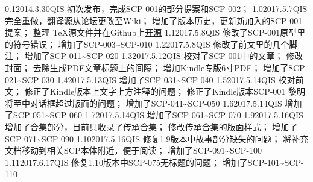 


\begin{versionhistory}
\vhEntry
{0.1}{2014.3.30}{QIS}{
	初次发布，完成SCP-001的部分提案和SCP-002；
}
\vhEntry
{1.0}{2017.5.7}{QIS}{
	完全重做，翻译源从论坛更改至Wiki；
	增加了版本历史，更新新加入的SCP-001提案；
	整理 \TeX 源文件并在Github上\href{https://github.com/7sDream/scp-pdf}{开源}
}
\vhEntry
{1.1}{2017.5.8}{QIS}{
	修改了SCP-001原型里的符号错误；
	增加了SCP-003\textasciitilde SCP-010
}
\vhEntry
{1.2}{2017.5.8}{QIS}{
	修改了前文里的几个脚注；
	增加了SCP-011\textasciitilde SCP-020
}
\vhEntry
{1.3}{2017.5.12}{QIS}{
	校对了SCP-001中的文章；
	修改封面；
	去除生成PDF文章标题上的间隔；
	增加Kindle专版6寸PDF；
	增加了SCP-021\textasciitilde SCP-030
}
\vhEntry
{1.4}{2017.5.13}{QIS}{
    增加了SCP-031\textasciitilde SCP-040
}
\vhEntry
{1.5}{2017.5.14}{QIS}{
    校对前文；
    修正了Kindle版本上文字上方注释的问题；
    修正了Kindle版本SCP-001 黎明将至中对话框超过版面的问题；
    增加了SCP-041\textasciitilde SCP-050
}
\vhEntry
{1.6}{2017.5.14}{QIS}{
    增加了SCP-051\textasciitilde SCP-060
}
\vhEntry
{1.7}{2017.5.14}{QIS}{
    增加了SCP-061\textasciitilde SCP-070
}
\vhEntry
{1.9}{2017.5.16}{QIS}{
    增加了合集部分，目前只收录了传承合集；
    修改传承合集的版面样式；
    增加了SCP-071\textasciitilde SCP-090
}
\vhEntry
{1.10}{2017.5.16}{QIS}{
    修复1.9版本中故事部分缺失的问题；
    将补充文档移动到相关SCP本体附近，便于阅读；
    增加了SCP-091\textasciitilde SCP-100
}
\vhEntry
{1.11}{2017.6.17}{QIS}{
    修复1.10版本中SCP-075无标题的问题；
    增加了SCP-101\textasciitilde SCP-110
}
\end{versionhistory}
